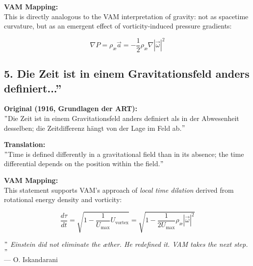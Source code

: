 \textbf{VAM Mapping:} \\
This is directly analogous to the VAM interpretation of gravity: not as spacetime curvature, but as an emergent effect of vorticity-induced pressure gradients:

\[
\nabla P = \rho_\text{\ae} \vec{a} = -\frac{1}{2} \rho_\text{\ae} \nabla |\vec{\omega}|^2
\]

\subsection*{5. \grqq Die Zeit ist in einem Gravitationsfeld anders definiert...\textquotedblright}
\textbf{Original (1916, Grundlagen der ART):} \\
\("\)Die Zeit ist in einem Gravitationsfeld anders definiert als in der Abwesenheit desselben; die Zeitdifferenz hängt von der Lage im Feld ab.\("\)

\textbf{Translation:} \\
\("\)Time is defined differently in a gravitational field than in its absence; the time differential depends on the position within the field.\("\)

\textbf{VAM Mapping:} \\
This statement supports VAM's approach of \emph{local time dilation} derived from rotational energy density and vorticity:

\[
\frac{d\tau}{dt} = \sqrt{1 - \frac{1}{U_\text{max}} U_{\text{vortex}}} = \sqrt{1 - \frac{1}{2U_\text{max}} \rho_\text{\ae} |\vec{\omega}|^2}
\]

\bigskip
\textit{ \("\) Einstein did not eliminate the æther. He redefined it. VAM takes the next step. \("\)}\\
\hfill — O. Iskandarani\\